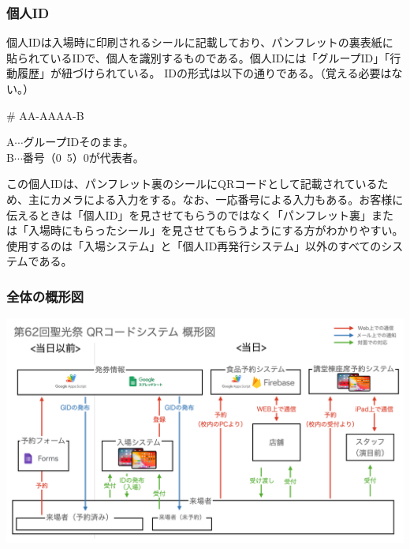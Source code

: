 \documentclass[dvipdfmx,jb5]{jarticle}
\begin{document}
 \subsubsection{個人ID}
 個人IDは入場時に印刷されるシールに記載しており、パンフレットの裏表紙に貼られているIDで、個人を識別するものである。個人IDには「グループID」「行動履歴」が紐づけられている。
 IDの形式は以下の通りである。（覚える必要はない。）
 \begin{screen}
 \begin{center}
 {\huge \# AA-AAAA-B}\\
 \end{center}
A$\cdots$グループIDそのまま。\\
B$\cdots$番号（0~5）0が代表者。
\end{screen}
この個人IDは、パンフレット裏のシールにQRコードとして記載されているため、主にカメラによる入力をする。なお、一応番号による入力もある。お客様に伝えるときは「個人ID」を見させてもらうのではなく「パンフレット裏」または「入場時にもらったシール」を見させてもらうようにする方がわかりやすい。使用するのは「入場システム」と「個人ID再発行システム」以外のすべてのシステムである。
\subsubsection{全体の概形図}
 \includegraphics[scale=0.2]{assets/qrcode-system-first-look.png}
\end{document}
